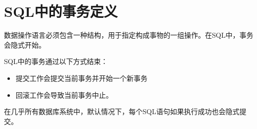 \section{SQL中的事务定义}

数据操作语言必须包含一种结构，用于指定构成事物的一组操作。在SQL中，事务会隐式开始。

SQL中的事务通过以下方式结束：
\begin{itemize}
    \item 提交工作会提交当前事务并开始一个新事务
    \item 回滚工作会导致当前事务中止。
\end{itemize}

在几乎所有数据库系统中，默认情况下，每个SQL语句如果执行成功也会隐式提交。